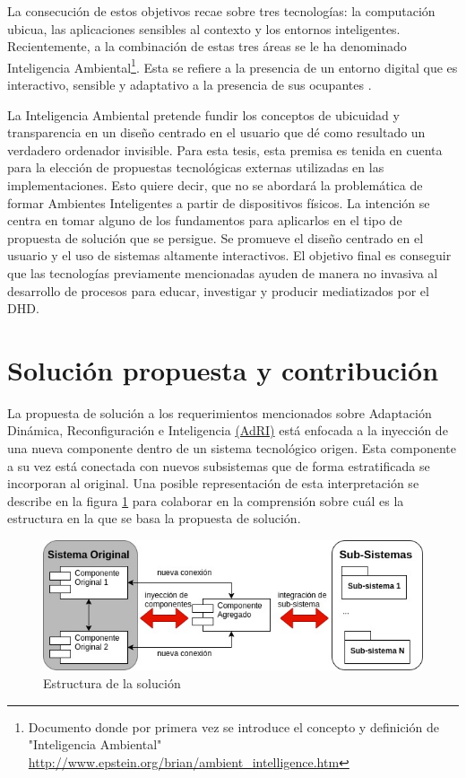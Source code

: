 La consecución de estos objetivos recae sobre tres tecnologías: la computación
ubicua, las aplicaciones sensibles al contexto y los entornos inteligentes.
Recientemente, a la combinación de estas tres áreas se le ha denominado
Inteligencia 
Ambiental\footnote{
Documento donde por primera vez se introduce el concepto y definición de
"Inteligencia
Ambiental"  \url{http://www.epstein.org/brian/ambient_intelligence.htm}}. Esta
se refiere a la presencia de un entorno digital
que es interactivo, sensible y adaptativo a la presencia de sus ocupantes
\cite{cap1.16}.

La Inteligencia Ambiental pretende fundir los conceptos de ubicuidad y
transparencia en un diseño centrado en el usuario que dé como resultado un
verdadero ordenador invisible. Para esta tesis, esta premisa es tenida en
cuenta para la elección de propuestas tecnológicas externas utilizadas en las
implementaciones. Esto quiere decir, que no se abordará la problemática de
formar Ambientes Inteligentes a partir de dispositivos físicos. La intención se
centra en tomar alguno de los fundamentos para aplicarlos en el tipo de
propuesta de solución que se persigue. Se promueve el diseño centrado en el
usuario y el uso de sistemas altamente interactivos. El objetivo
final es conseguir que las tecnologías previamente mencionadas ayuden de
manera no invasiva al desarrollo de procesos para educar, investigar y producir
mediatizados por el DHD. 



\section{Solución propuesta y contribución}

La propuesta de solución a los requerimientos mencionados sobre
Adaptación Dinámica, Reconfiguración e Inteligencia \hyperref[AdRI]{(AdRI)} 
está enfocada a la
inyección de una nueva componente dentro de un sistema tecnológico origen. Esta
componente a su vez está conectada con nuevos subsistemas que de forma
estratificada se incorporan al original. Una posible representación de
esta interpretación se describe en la figura \ref{fig:solucion} para colaborar
en la comprensión sobre cuál es la estructura en la que se basa la propuesta de
solución.


\begin{figure}[h]
\begin{center}
\includegraphics[width=5 in,totalheight=3 in] {Ch0/EstructuraSolucion}
\caption{Estructura de la solución} \label{fig:solucion}
\end{center}
\end{figure}

